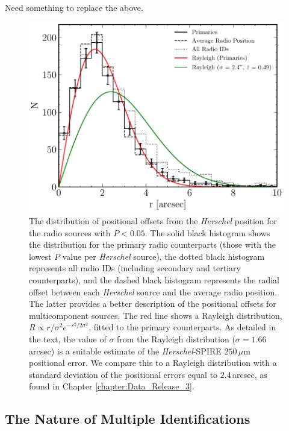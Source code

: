 {\color{red} Need something to replace the above.}

\begin{figure}
	\centering
	\includegraphics[width=0.75\columnwidth]{Figures/source_counterpart_offsets.pdf}
	\caption[Distribution of radial offsets between \textit{Herschel} sources and radio IDs]{The distribution of positional offsets from the \textit{Herschel} position for the radio sources with $P < 0.05$. The solid black histogram shows the distribution for the primary radio counterparts (those with the lowest $P$ value per \textit{Herschel} source), the dotted black histogram represents all radio IDs (including secondary and tertiary counterparts), and the dashed black histogram represents the radial offset between each \textit{Herschel} source and the average radio position. The latter provides a better description of the positional offsets for multicomponent sources. The red line shows a Rayleigh distribution, $R \propto r/\sigma^2 e^{-r^2/2\sigma^2}$, fitted to the primary counterparts. As detailed in the text, the value of $\sigma$ from the Rayleigh distribution ($\sigma = 1.66\,$arcsec) is a suitable estimate of the \textit{Herschel}-SPIRE $250\,\mu$m positional error. We compare this to a Rayleigh distribution with a standard deviation of the positional errors equal to $2.4\,$arcsec, as found in Chapter \ref{chapter:Data_Release_3}.}
	\label{fig:source_counterpart_offset}
\end{figure}

\subsection{The Nature of Multiple Identifications}
\label{sec:multiple_systems}

